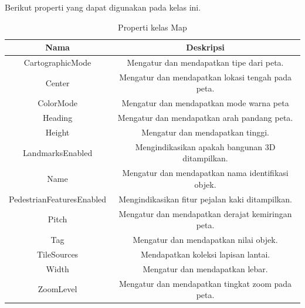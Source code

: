Berikut properti yang dapat digunakan pada kelas ini.
\begin{table}[h]
	\centering
		\begin{tabular}{ |c|c|}
				\hline
					Nama & Deskripsi \\ \hline
					CartographicMode & Mengatur dan mendapatkan tipe dari peta. \\ \hline
					Center & Mengatur dan mendapatkan lokasi tengah pada peta. \\ \hline
					ColorMode & Mengatur dan mendapatkan mode warna peta \\ \hline
					Heading & Mengatur dan mendapatkan arah pandang peta. \\ \hline
					Height & Mengatur dan mendapatkan tinggi. \\ \hline
					LandmarksEnabled & Mengindikasikan apakah bangunan 3D ditampilkan. \\ \hline
					Name & Mengatur dan mendapatkan nama identifikasi objek. \\ \hline
					PedestrianFeaturesEnabled & Mengindikasikan fitur pejalan kaki ditampilkan. \\ \hline
					Pitch & Mengatur dan mendapatkan derajat kemiringan peta. \\ \hline
					Tag & Mengatur dan mendapatkan nilai objek. \\ \hline
					TileSources & Mendapatkan koleksi lapisan lantai. \\ \hline
					Width & Mengatur dan mendapatkan lebar. \\ \hline
					ZoomLevel & Mengatur dan mendapatkan tingkat zoom pada peta. \\ \hline
				\hline
		\end{tabular}
	\caption{Properti kelas Map}
	\label{tab:PropertiKelasMap}
\end{table}

